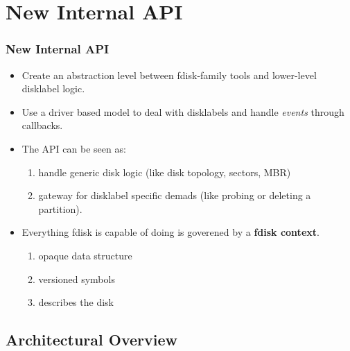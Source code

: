 
\section{New Internal API}
\begin{frame}\frametitle{New Internal API}
  \begin{itemize}
  \item Create an abstraction level between fdisk-family tools and lower-level disklabel logic.
  \item Use a driver based model to deal with disklabels and handle \emph{events} through callbacks.
  \item The API can be seen as:
    \begin{enumerate}
    \item handle generic disk logic (like disk topology, sectors, MBR)
    \item gateway for disklabel specific demads (like probing or deleting a partition).
    \end{enumerate}
  \item Everything fdisk is capable of doing is goverened by a \textbf{fdisk context}.
    \begin{enumerate}
    \item opaque data structure
    \item versioned symbols
    \item describes the disk
    \end{enumerate}
  \end{itemize}
\end{frame}

\subsection{Architectural Overview}
\begin{frame}
\end{frame}

